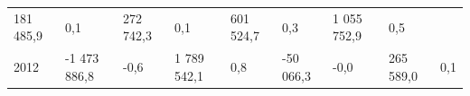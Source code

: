 \begin{longtable}[]{@{}lllllllll@{}}
\begin{minipage}[t]{0.10\columnwidth}
181 485,9\strut
\end{minipage} & \begin{minipage}[t]{0.06\columnwidth}\raggedright
0,1\strut
\end{minipage} & \begin{minipage}[t]{0.16\columnwidth}\raggedright
272 742,3\strut
\end{minipage} & \begin{minipage}[t]{0.06\columnwidth}\raggedright
0,1\strut
\end{minipage} & \begin{minipage}[t]{0.12\columnwidth}\raggedright
601 524,7\strut
\end{minipage} & \begin{minipage}[t]{0.06\columnwidth}\raggedright
0,3\strut
\end{minipage} & \begin{minipage}[t]{0.10\columnwidth}\raggedright
1 055 752,9\strut
\end{minipage} & \begin{minipage}[t]{0.06\columnwidth}\raggedright
0,5\strut
\end{minipage}\tabularnewline
\begin{minipage}[t]{0.05\columnwidth}\raggedright
2012\strut
\end{minipage} & \begin{minipage}[t]{0.10\columnwidth}\raggedright
-1 473 886,8\strut
\end{minipage} & \begin{minipage}[t]{0.06\columnwidth}\raggedright
-0,6\strut
\end{minipage} & \begin{minipage}[t]{0.16\columnwidth}\raggedright
1 789 542,1\strut
\end{minipage} & \begin{minipage}[t]{0.06\columnwidth}\raggedright
0,8\strut
\end{minipage} & \begin{minipage}[t]{0.12\columnwidth}\raggedright
-50 066,3\strut
\end{minipage} & \begin{minipage}[t]{0.06\columnwidth}\raggedright
-0,0\strut
\end{minipage} & \begin{minipage}[t]{0.10\columnwidth}\raggedright
265 589,0\strut
\end{minipage} & \begin{minipage}[t]{0.06\columnwidth}\raggedright
0,1\strut
\end{minipage}\tabularnewline

\end{longtable}
